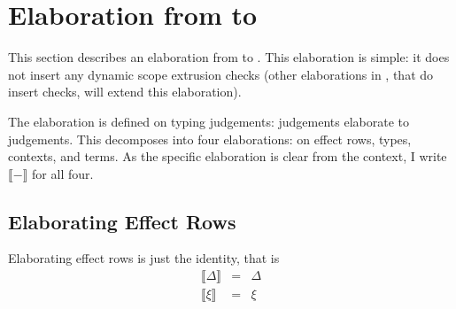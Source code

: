 \section{Elaboration from \texorpdfstring{\sourceLang{}}{Lambda-Op-Quote-Splice} to \texorpdfstring{\coreLang{}}{Lambda-Op-AST}}\label{section:elaboration}
This section describes an elaboration from \sourceLang{} to \coreLang{}. This elaboration is simple: it does not insert any dynamic scope extrusion checks (other elaborations in , that do insert checks, will extend this elaboration).

\newcommand{\elaborate}[1]{\llbracket #1 \rrbracket}
\newcommand{\erase}[1]{\textsf{erase}(#1)}
\newcommand{\AST}[1]{\textsf{AST}(#1)}
\newcommand{\Code}[1]{\textsf{Code}(#1)}


The elaboration is defined on typing judgements: \sourceLang{} judgements elaborate to \coreLang{} judgements. This decomposes into four elaborations: on effect rows, types, contexts, and terms. As the specific elaboration is clear from the context, I write $\llbracket - \rrbracket$ for all four.

\subsection{Elaborating Effect Rows}
Elaborating effect rows is just the identity, that is 
\[\begin{array}{rcl}
  \elaborate{\Delta} &=& \Delta \\
  \elaborate{\xi}&=&{\xi}
\end{array}\]

